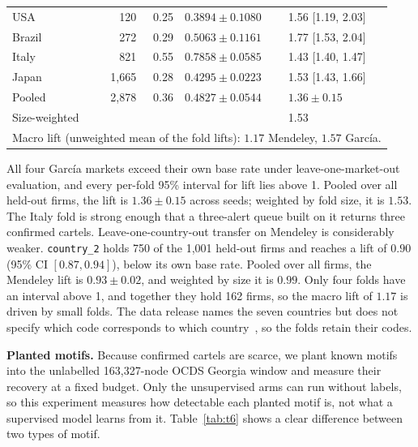 \documentclass[conference]{IEEEtran}
\begin{document}
\begin{table}[t]
\begin{tabular}{lrrll}
\quad USA & 120 & 0.25 & $0.3894 \pm 0.1080$ & 1.56 [1.19, 2.03] \\
\quad Brazil & 272 & 0.29 & $0.5063 \pm 0.1161$ & 1.77 [1.53, 2.04] \\
\quad Italy & 821 & 0.55 & $0.7858 \pm 0.0585$ & 1.43 [1.40, 1.47] \\
\quad Japan & 1,665 & 0.28 & $0.4295 \pm 0.0223$ & 1.53 [1.43, 1.66] \\
\quad Pooled & 2,878 & 0.36 & $0.4827 \pm 0.0544$ & $1.36 \pm 0.15$ \\
\quad Size-weighted & & & & 1.53 \\
\midrule
\multicolumn{5}{l}{\scriptsize Macro lift (unweighted mean of the fold
lifts): $1.17$ Mendeley, $1.57$ Garc\'ia.} \\
\bottomrule
\end{tabular}
\end{table}

All four Garc\'ia markets exceed their own base rate under leave-one-market-out
evaluation, and every per-fold 95\% interval for lift lies above 1. Pooled over
all held-out firms, the lift is $1.36 \pm 0.15$ across seeds; weighted by fold
size, it is $1.53$. The Italy fold is strong enough that a three-alert queue
built on it returns three confirmed cartels. Leave-one-country-out transfer on
Mendeley is considerably weaker. \texttt{country\_2} holds 750 of the 1,001
held-out firms and reaches a lift of $0.90$ (95\% CI $[0.87, 0.94]$), below its
own base rate. Pooled over all firms, the Mendeley lift is $0.93 \pm 0.02$, and
weighted by size it is $0.99$. Only four folds have an interval above 1, and
together they hold 162 firms, so the macro lift of $1.17$ is driven by small
folds. The data release names the seven countries but does not specify which
code corresponds to which country~\cite{mendeley2025}, so the folds retain
their codes.

\textbf{Planted motifs.} Because confirmed cartels are scarce, we plant known
motifs into the unlabelled 163,327-node OCDS Georgia window and measure their
recovery at a fixed budget. Only the unsupervised arms can run without labels,
so this experiment measures how detectable each planted motif is, not what a
supervised model learns from it. Table~\ref{tab:t6} shows a clear difference
between two types of motif.
\label{sec:injection}
\end{document}
